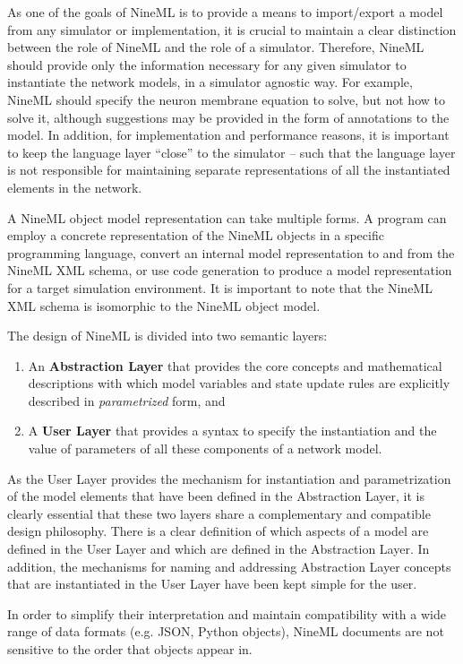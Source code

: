 \documentclass[draftspec]{ninemlspec}
\begin{document}
As one of the goals of NineML is to provide a means to import/export a model from
any simulator or implementation, it is crucial to maintain a clear distinction
between the role of NineML and the role of a simulator. Therefore, NineML should
provide only the information necessary for any given simulator
to instantiate the network models, in a simulator agnostic way.
For example, NineML should specify the neuron membrane equation to solve,
but not how to solve it, although suggestions may be provided in the form of annotations
to the model.  In addition, for implementation and performance
reasons, it is important to keep the language layer ``close'' to the simulator
-- such that the language layer is not responsible for maintaining separate
representations of all the instantiated elements in the network.

A NineML object model representation can take multiple forms.  A
program can employ a concrete representation of the NineML objects in
a specific programming language, convert an internal model
representation to and from the NineML XML schema, or use code generation 
to produce a model representation for a target simulation environment. 
It is important to note that the NineML XML schema is isomorphic to the NineML
object model.

The design of NineML is divided into two semantic layers:
\begin {enumerate}
\item An {\bf Abstraction Layer} that provides the core concepts and
mathematical descriptions with which model variables and state update
rules are explicitly described in {\em parametrized} form, and
\item A {\bf User Layer} that provides a syntax to specify the
instantiation and the value of parameters of all these components of a network
model.
\end {enumerate}

As the User Layer provides the mechanism for instantiation and
parametrization of the model elements that have been defined in the
Abstraction Layer, it is clearly essential that these two layers share
a complementary and compatible design philosophy. There is a
clear definition of which aspects of a model are defined in the User
Layer and which are defined in the Abstraction Layer. In addition,
the mechanisms for naming and addressing Abstraction Layer concepts
that are instantiated in the User Layer have been kept simple for the
user.

In order to simplify their interpretation and maintain compatibility with a wide range of data formats (e.g. JSON, Python objects), NineML documents are not sensitive to the order that objects appear in.
\end{document}
